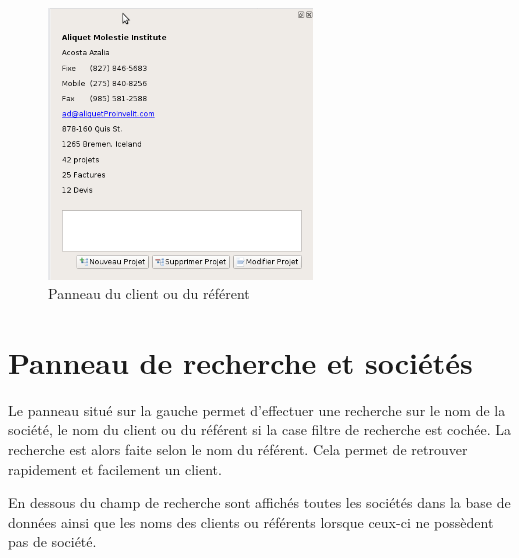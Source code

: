\begin{figure}[H]
	\centering
	\includegraphics[width=7cm]{screens/dockDroite.png}
	\caption{Panneau du client ou du référent}
	\label{fig:rightpanel}
\end{figure}

\section{Panneau de recherche et sociétés}
Le panneau situé sur la gauche permet d’effectuer une recherche sur le nom de la société, le nom du client ou du référent si la case filtre de recherche est cochée. La recherche est alors faite selon le nom du référent. Cela permet de retrouver rapidement et facilement un client.

En dessous du champ de recherche sont affichés toutes les sociétés dans la base de données ainsi que les noms des clients ou référents lorsque ceux-ci ne possèdent pas de société.




